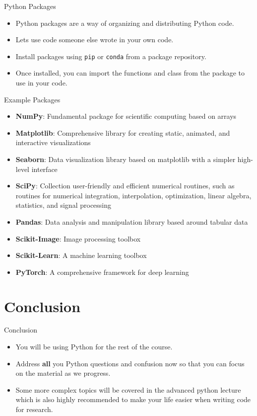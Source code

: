 \documentclass[aspectratio=169]{beamer}
\begin{document}
\begin{frame}{Python Packages}
    \begin{itemize}
        \item Python packages are a way of organizing and distributing Python code.
        \item Lets use code someone else wrote in your own code.
        \item Install packages using \texttt{pip} or \texttt{conda} from a package repository.
        \item Once installed, you can import the functions and class from the package to use in your code.
    \end{itemize}
\end{frame}

\begin{frame}{Example Packages}
    \begin{itemize}
        \item \textbf{NumPy}: Fundamental package for scientific computing based on arrays
        \item \textbf{Matplotlib}: Comprehensive library for creating static, animated, and interactive visualizations
        \item \textbf{Seaborn}: Data visualization library based on matplotlib with a simpler high-level interface
        \item \textbf{SciPy}: Collection user-friendly and efficient numerical routines, such as routines for numerical integration, interpolation, optimization, linear algebra, statistics, and signal processing
        \item \textbf{Pandas}: Data analysis and manipulation library based around tabular data
        \item \textbf{Scikit-Image}: Image processing toolbox
        \item \textbf{Scikit-Learn}: A machine learning toolbox
        \item \textbf{PyTorch}: A comprehensive framework for deep learning
    \end{itemize}
\end{frame}

\section{Conclusion}

\begin{frame}{Conclusion}
    \begin{itemize}
        \item You will be using Python for the rest of the course.
        \item Address \textbf{all} you Python questions and confusion now so that you can focus on the material as we progress.
        \item Some more complex topics will be covered in the advanced python lecture which is also highly recommended to make your life easier when writing code for research.
    \end{itemize}
\end{frame}
\end{document}
